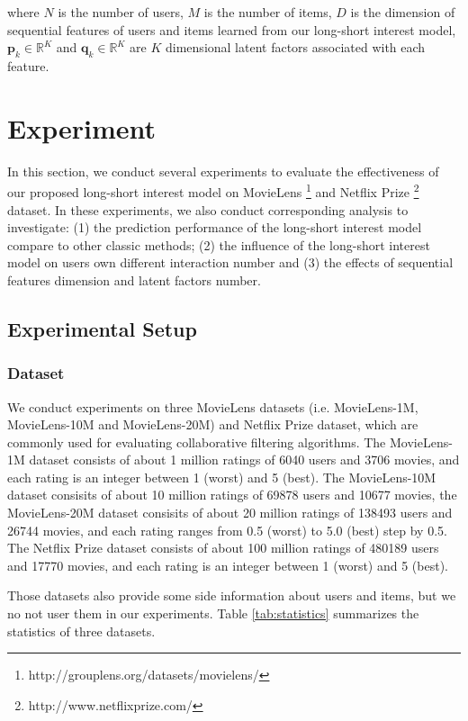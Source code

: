 \documentclass{sig-alternate-05-2015}
\begin{document}
where $N$ is the number of users, $M$ is the number of items,
$D$ is the dimension of sequential features of users and items learned from
our long-short interest model,
$\mathbf{p}_{k} \in \mathbb{R}^K$ and $\mathbf{q}_{k} \in \mathbb{R}^K$
are $K$ dimensional latent factors associated with each feature.

\section{Experiment}
In this section, we conduct several experiments to evaluate the effectiveness
of our proposed long-short interest model on
MovieLens \footnote{http://grouplens.org/datasets/movielens/}
and Netflix Prize \footnote{http://www.netflixprize.com/} dataset.
In these experiments, we also conduct corresponding analysis to investigate:
(1) the prediction performance of the long-short interest model compare to other classic methods;
(2) the influence of the long-short interest model on users own different interaction number and
(3) the effects of sequential features dimension and latent factors number.

\subsection{Experimental Setup}
\subsubsection{Dataset}
We conduct experiments on three MovieLens datasets (i.e. MovieLens-1M, MovieLens-10M and MovieLens-20M)
and Netflix Prize dataset, which are commonly used for evaluating collaborative filtering algorithms.
The MovieLens-1M dataset consists of about 1 million ratings of 6040 users and 3706 movies,
and each rating is an integer between 1 (worst) and 5 (best).
The MovieLens-10M dataset consisits of about 10 million ratings of 69878 users and 10677 movies,
the MovieLens-20M dataset consisits of about 20 million ratings of 138493 users and 26744 movies,
and each rating ranges from 0.5 (worst) to 5.0 (best) step by 0.5.
The Netflix Prize dataset consists of about 100 million ratings of 480189 users and 17770 movies,
and each rating is an integer between 1 (worst) and 5 (best).

Those datasets also provide some side information about users and items,
but we no not user them in our experiments.
Table \ref{tab:statistics} summarizes the statistics of three datasets.
\end{document}
